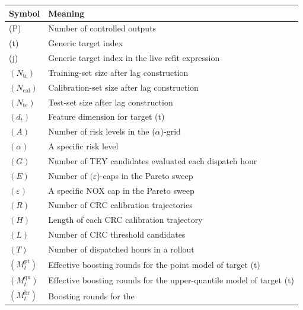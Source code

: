 \documentclass[11pt]{article}
\newcounter{none} %
\begin{document}
{\def\LTcaptype{none} %
\begin{longtable}[]{@{}
  >{\raggedright\arraybackslash}p{}
  >{\raggedright\arraybackslash}p{}@{}}
\toprule\noalign{}
\begin{minipage}[b]{\linewidth}\raggedright
\textbf{Symbol}
\end{minipage} & \begin{minipage}[b]{\linewidth}\raggedright
\textbf{Meaning}
\end{minipage} \\
\midrule\noalign{}
\endhead
\bottomrule\noalign{}
\endlastfoot
(P) & Number of controlled outputs \\
(t) & Generic target index \\
(j) & Generic target index in the live refit expression \\
\(\left( N_{\text{tr}} \right)\) & Training-set size after lag
construction \\
\(\left( N_{\text{cal}} \right)\) & Calibration-set size after lag
construction \\
\(\left( N_{\text{te}} \right)\) & Test-set size after lag
construction \\
\(\left( d_{t} \right)\) & Feature dimension for target (t) \\
\((A)\) & Number of risk levels in the (\(\alpha\))-grid \\
\((\alpha)\) & A specific risk level \\
\((G)\) & Number of TEY candidates evaluated each dispatch hour \\
\((E)\) & Number of \((\varepsilon\))-caps in the Pareto sweep \\
\((\varepsilon)\) & A specific NOX cap in the Pareto sweep \\
\((R)\) & Number of CRC calibration trajectories \\
\((H)\) & Length of each CRC calibration trajectory \\
\((L)\) & Number of CRC threshold candidates \\
\((T)\) & Number of dispatched hours in a rollout \\
\(\left( M_{t}^{\text{pt}} \right)\) & Effective boosting rounds for the
point model of target (t) \\
\(\left( M_{t}^{\text{qu}} \right)\) & Effective boosting rounds for the
upper-quantile model of target (t) \\
\(\left( M_{t}^{\text{br}} \right)\) & Boosting rounds for the

\end{longtable}}
\end{document}
